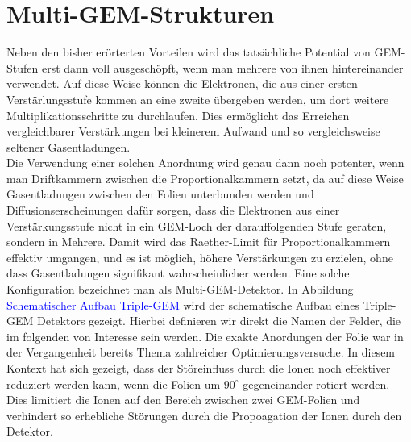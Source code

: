 \section{Multi-GEM-Strukturen}
	Neben den bisher erörterten Vorteilen wird das tatsächliche Potential von GEM-Stufen erst dann voll ausgeschöpft, wenn man mehrere von ihnen hintereinander verwendet. Auf diese Weise können die Elektronen, die aus einer ersten Verstärlungsstufe kommen an eine zweite übergeben werden, um dort weitere Multiplikationsschritte zu durchlaufen. Dies ermöglicht das Erreichen vergleichbarer Verstärkungen bei kleinerem Aufwand und so vergleichsweise seltener Gasentladungen. \\
	Die Verwendung einer solchen Anordnung wird genau dann noch potenter, wenn man Driftkammern zwischen die Proportionalkammern setzt, da auf diese Weise Gasentladungen zwischen den Folien unterbunden werden und Diffusionserscheinungen dafür sorgen, dass die Elektronen aus einer Verstärkungsstufe nicht in ein GEM-Loch der darauffolgenden Stufe geraten, sondern in Mehrere. Damit wird das Raether-Limit für Proportionalkammern effektiv umgangen, und es ist möglich, höhere Verstärkungen zu erzielen, ohne dass Gasentladungen signifikant wahrscheinlicher werden. Eine solche Konfiguration bezeichnet man als Multi-GEM-Detektor. In Abbildung \textcolor{blue}{Schematischer Aufbau Triple-GEM} wird der schematische Aufbau eines Triple-GEM Detektors gezeigt. Hierbei definieren wir direkt die Namen der Felder, die im folgenden von Interesse sein werden. Die exakte Anordungen der Folie war in der Vergangenheit bereits Thema zahlreicher Optimierungsversuche. In diesem Kontext hat sich gezeigt, dass der Störeinfluss durch die Ionen noch effektiver reduziert werden kann, wenn die Folien um $90^{\circ}$ gegeneinander rotiert werden. Dies limitiert die Ionen auf den Bereich zwischen zwei GEM-Folien und verhindert so erhebliche Störungen durch die Propoagation der Ionen durch den Detektor.
	
	
	
	\newpage

